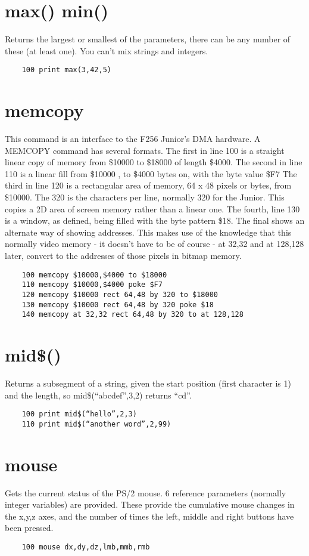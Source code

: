 \section*{max() min()}
Returns the largest or smallest of the parameters, there can be any number of these (at least one). You can’t mix strings and integers.
\example{}
\begin{verbatim}
	100 print max(3,42,5)
\end{verbatim}

\section*{memcopy}
This command is an interface to the F256 Junior's DMA hardware. A MEMCOPY command has several formats. 
The first in line 100 is a straight linear copy of memory from \$10000 to \$18000 of length \$4000. The second in line 110 is a linear fill from \$10000 , to \$4000 bytes on, with the byte value \$F7
The third in line 120 is a rectangular area of memory, 64 x 48 pixels or bytes, from \$10000. The 320 is the characters per line, normally 320 for the Junior. This copies a 2D area of screen memory rather than a linear one. The fourth, line 130 is a window, as defined, being filled with the byte pattern \$18.
The final shows an alternate way of showing addresses. This makes use of the knowledge that this normally video memory - it doesn't have to be of course - at 32,32 and at 128,128 later, convert to the addresses of those pixels in bitmap memory.
\begin{verbatim}
	100 memcopy $10000,$4000 to $18000
	110 memcopy $10000,$4000 poke $F7
	120 memcopy $10000 rect 64,48 by 320 to $18000
	130 memcopy $10000 rect 64,48 by 320 poke $18
	140 memcopy at 32,32 rect 64,48 by 320 to at 128,128
\end{verbatim}

\section*{mid\$()}
Returns a subsegment of a string, given the start position (first character is 1) and the length, so mid\$(“abcdef”,3,2) returns “cd”. 
\example{}
\begin{verbatim}
	100 print mid$(“hello”,2,3)
	110 print mid$(“another word”,2,99)
\end{verbatim}

\section*{mouse}
Gets the current status of the PS/2 mouse. 6 reference parameters (normally integer variables) are provided. These provide the cumulative mouse changes in the x,y,z axes, and the number of times the left, middle and right buttons have been pressed.
\example{}
\begin{verbatim}
	100 mouse dx,dy,dz,lmb,mmb,rmb
\end{verbatim}

